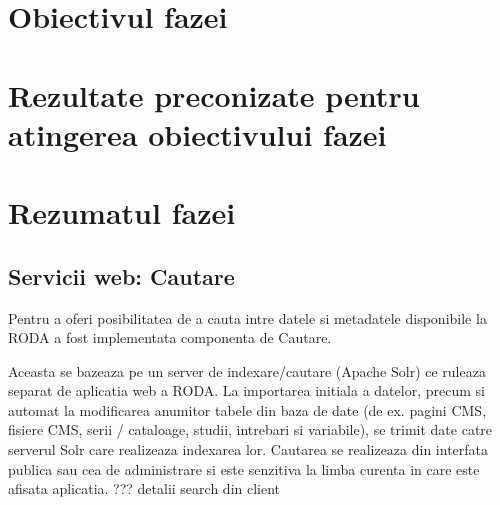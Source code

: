 \documentclass[a4paper, 10pt]{article}
\begin{document}
{\section{Obiectivul fazei}






\section{Rezultate preconizate pentru atingerea obiectivului fazei}


\begin{comment}
 
Urmatoarele sisteme ale aplicatiei au fost realizate:
\begin{itemize}
\item
Modul de administrare
\item
Modul de acces la date
\item
Motor statistic
\end{itemize}

\end{comment}


\section{Rezumatul fazei}

\medskip

\subsection{Servicii web: Cautare}

Pentru a oferi posibilitatea de a cauta intre datele si metadatele disponibile la RODA 
a fost implementata componenta de Cautare.

Aceasta se bazeaza pe un server de indexare/cautare (Apache Solr) ce ruleaza separat de aplicatia web a RODA. 
La importarea initiala a datelor, precum si automat la modificarea anumitor tabele din baza de date 
(de ex. pagini CMS, fisiere CMS, serii / cataloage, studii, intrebari si variabile), 
se trimit date catre serverul Solr care realizeaza indexarea lor.
Cautarea se realizeaza din interfata publica sau cea de administrare si este senzitiva la limba curenta in care este afisata aplicatia.
??? detalii search din client

}
\end{document}
